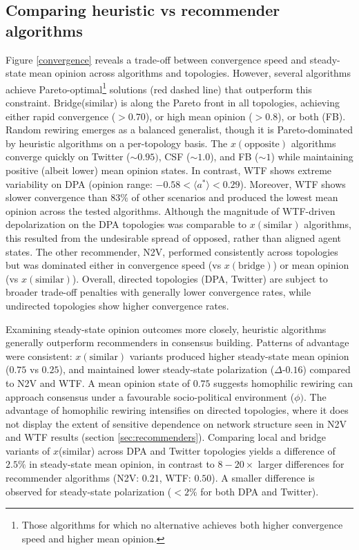 \documentclass[unnumsec,webpdf,contemporary,large]{oup-authoring-template}%
\theoremstyle{thmstyleone}%
\theoremstyle{thmstyletwo}%
\theoremstyle{thmstylethree}%
\begin{document}
\subsection{Comparing heuristic vs recommender algorithms}\label{sec:comparing}
Figure \ref{convergence} reveals a trade-off between convergence speed and steady-state mean opinion across algorithms and topologies. However, several algorithms achieve Pareto-optimal\footnote{Those algorithms for which no alternative achieves both higher convergence speed and higher mean opinion.} solutions (red dashed line) that outperform this constraint. Bridge(similar) is along the Pareto front in all topologies, achieving either rapid convergence ($>0.70$), or high  mean opinion ($>0.8$), or both (FB). Random rewiring emerges as a balanced generalist, though it is Pareto-dominated by heuristic algorithms on a per-topology basis. The $x(\text{opposite})$ algorithms converge quickly on Twitter ($\sim 0.95)$, CSF ($\sim1.0$), and FB ($\sim1$) while maintaining positive (albeit lower) mean opinion states. In contrast,  WTF shows extreme variability on DPA (opinion range: $-0.58 < \langle a^* \rangle < 0.29$).  Moreover, WTF shows slower convergence than $83\%$ of other scenarios and produced the lowest mean opinion across the tested algorithms.  Although the magnitude of WTF-driven depolarization on the DPA topologies was comparable to $x(\text{similar})$ algorithms, this resulted from the undesirable spread of opposed, rather than aligned agent states. The other recommender, N2V, performed consistently across topologies but was dominated either in convergence speed (vs $x(\text{bridge})$) or mean opinion (vs $x(\text{similar})$). Overall, directed topologies (DPA, Twitter) are subject to broader trade-off penalties with generally lower convergence rates, while undirected topologies show higher convergence rates.

Examining steady-state opinion outcomes more closely, heuristic algorithms generally outperform recommenders in consensus building. Patterns of advantage were consistent: $x(\text{similar})$ variants produced higher steady-state mean opinion ($0.75$ vs $0.25$), and maintained lower steady-state polarization ($\Delta$-$0.16$) compared to N2V and WTF.  A mean opinion state of $0.75$ suggests homophilic rewiring can approach consensus under a favourable socio-political environment ($\phi)$. The advantage of homophilic rewiring intensifies on directed topologies, where it does not display the extent of sensitive dependence on network structure seen in N2V and WTF results (section \ref{sec:recommenders}). Comparing local and bridge variants of $x$(similar) across DPA and Twitter topologies yields a difference of $2.5\%$ in steady-state mean opinion, in contrast to $8-20\times$ larger differences for recommender algorithms (N2V: $0.21$, WTF: $0.50$). A smaller difference is observed for steady-state polarization ($<2\%$ for both DPA and Twitter).
\end{document}
